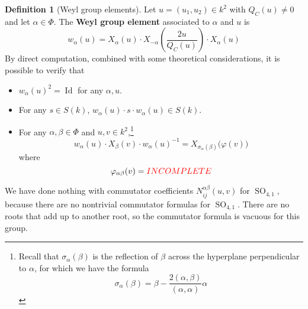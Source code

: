 \documentclass[12pt]{article}
\theoremstyle{definition}
\newtheorem{definition}[theorem]{Definition}
\numberwithin{theorem}{subsection}
\newcommand{\sig}{\sigma}
\newcommand{\lp}{\left(}
\newcommand{\rp}{\right)}
\newcommand{\tbf}{\textbf}
\newcommand{\noi}{\noindent}
\newcommand{\incomplete}{\textcolor{red}{INCOMPLETE}}
\newcommand{\inv}{^{-1}}
\DeclareMathOperator{\SO}{SO}
\DeclareMathOperator{\Id}{Id}
\begin{document}

\begin{definition}[Weyl group elements]
Let $u = (u_1, u_2) \in k^2$ with $Q_C(u) \neq 0$ and let $\alpha \in \Phi$. The \tbf{Weyl group element} associated to $\alpha$ and $u$ is
\[
	w_\alpha(u) = X_\alpha(u) \cdot X_{-\alpha} \lp \frac{2u}{Q_C(u)} \rp \cdot X_\alpha(u)
\]
By direct computation, combined with some theoretical considerations, it is possible to verify that
\begin{itemize}
	\item $w_\alpha(u)^2 = \Id$ for any $\alpha, u$.
	\item For any $s \in S(k)$, $w_\alpha(u) \cdot s \cdot w_\alpha(u) \in S(k)$.
	\item For any $\alpha, \beta \in \Phi$ and $u,v \in k^2$,\footnote{Recall that $\sig_\alpha(\beta)$ is the reflection of $\beta$ across the hyperplane perpendicular to $\alpha$, for which we have the formula
		\[
			\sig_\alpha(\beta) = \beta - \frac{2 (\alpha,\beta)}{(\alpha,\alpha)} \alpha
		\]}
	\[
		w_\alpha(u) \cdot X_\beta(v) \cdot w_\alpha(u) \inv = X_{\sig_\alpha(\beta)} \Big( \varphi (v) \Big)
	\]
	where
	\[
		\varphi_{\alpha \beta} (v) = \incomplete
	\]
\end{itemize}
\end{definition}

\noi We have done nothing with commutator coefficients $N_{ij}^{\alpha \beta}(u,v)$ for $\SO_{4,1}$, because there are no nontrivial commutator formulas for $\SO_{4,1}$. There are no roots that add up to another root, so the commutator formula is vacuous for this group.
\end{document}
